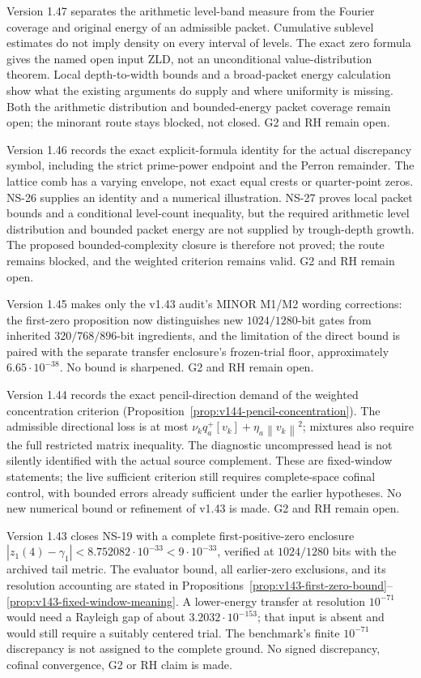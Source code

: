 \documentclass[11pt]{article}
\theoremstyle{remark}
\newcommand{\norm}[1]{\left\lVert #1\right\rVert}
\begin{document}
Version 1.47 separates the arithmetic level-band measure from the
Fourier coverage and original energy of an admissible packet. Cumulative
sublevel estimates do not imply density on every interval of levels.
The exact zero formula gives the named open input ZLD, not an
unconditional value-distribution theorem. Local depth-to-width bounds and
a broad-packet energy calculation show what the existing arguments do
supply and where uniformity is missing. Both the arithmetic distribution
and bounded-energy packet coverage remain open; the minorant route stays
blocked, not closed. G2 and RH remain open.

Version 1.46 records the exact explicit-formula identity for the actual
discrepancy symbol, including the strict prime-power endpoint and the
Perron remainder. The lattice comb has a varying envelope, not exact
equal crests or quarter-point zeros. NS-26 supplies an identity and a
numerical illustration. NS-27 proves local packet bounds and a conditional
level-count inequality, but the required arithmetic level distribution and
bounded packet energy are not supplied by trough-depth growth. The proposed
bounded-complexity closure is therefore not proved; the route remains
blocked, and the weighted criterion remains valid. G2 and RH remain open.

Version 1.45 makes only the v1.43 audit's MINOR M1/M2 wording corrections:
the first-zero proposition now distinguishes new $1024/1280$-bit gates
from inherited $320/768/896$-bit ingredients, and the limitation of the
direct bound is paired with the separate transfer enclosure's frozen-trial
floor, approximately $6.65\cdot10^{-38}$. No bound is sharpened. G2 and RH
remain open.

Version 1.44 records the exact pencil-direction demand of the weighted
concentration criterion (Proposition~\ref{prop:v144-pencil-concentration}).
The admissible directional loss is at most
$\nu_kq_a^+[v_k]+\eta_a\norm{v_k}^2$; mixtures also require the full
restricted matrix inequality. The diagnostic uncompressed head is not
silently identified with the actual source complement. These are
fixed-window statements; the live sufficient criterion still requires
complete-space cofinal control, with bounded errors already sufficient
under the earlier hypotheses. No new numerical bound or refinement of
v1.43 is made. G2 and RH remain open.

Version 1.43 closes NS-19 with a complete first-positive-zero enclosure
$|z_1(4)-\gamma_1|<8.752082\cdot10^{-33}<9\cdot10^{-33}$, verified
at $1024/1280$ bits with the archived tail metric. The evaluator bound,
all earlier-zero exclusions, and its resolution accounting are stated
in Propositions~\ref{prop:v143-first-zero-bound}--\ref{prop:v143-fixed-window-meaning}.
A lower-energy transfer at resolution $10^{-71}$ would need a Rayleigh
gap of about $3.2032\cdot10^{-153}$; that input is absent and would
still require a suitably centered trial. The benchmark's finite
$10^{-71}$ discrepancy is not assigned to the complete ground.
No signed discrepancy, cofinal convergence, G2 or RH claim is made.
\end{document}

